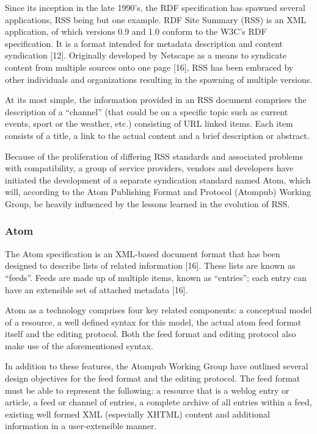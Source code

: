 \documentclass{CRPITStyle}
\begin{document}
Since its inception in the late 1990's, the RDF specification has
spawned several applications, RSS being but one example. RDF Site
Summary (RSS) is an XML application, of which versions 0.9 and 1.0
conform to the W3C's RDF specification. It is a format intended for
metadata description and content syndication [12]. Originally developed
by Netscape as a means to syndicate content from multiple sources onto
one page [16], RSS has been embraced by other individuals and
organizations resulting in the spawning of multiple versions.

At its most simple, the information provided in an RSS document
comprises the description of a ``channel'' (that could be on a specific
topic such as current events, sport or the weather, etc.) consisting of
URL linked items. Each item consists of a title, a link to the actual
content and a brief description or abstract.

Because of the proliferation of differing RSS standards and associated
problems with compatibility, a group of service providers, vendors and
developers have initiated the development of a separate syndication
standard named Atom, which will, according to the Atom Publishing Format
and Protocol (Atompub) Working Group, be heavily influenced by the
lessons learned in the evolution of RSS.

\subsubsection{Atom}

The Atom  specification is an XML-based document format that has been
designed to describe lists of related information [16]. These lists are
known as ``feeds''. Feeds are made up of multiple items, known as
``entries''; each entry can have an extensible set of attached metadata
[16].

Atom as a technology comprises four key related components: a conceptual
model of a resource, a well defined syntax for this model, the actual
atom feed format itself and the editing protocol. Both the feed format
and editing protocol also make use of the aforementioned syntax.

In addition to these features, the Atompub Working Group have outlined
several design objectives for the feed format and the editing protocol.
The feed format must be able to represent the following: a resource that
is a weblog entry or article, a feed or channel of entries, a complete
archive of all entries within a feed, existing well formed XML
(especially XHTML) content and additional information in a
user-extensible manner.
\end{document}
